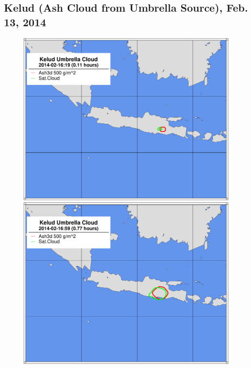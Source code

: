 \subsection{Kelud (Ash Cloud from Umbrella Source), Feb. 13, 2014}
\begin{figure}[htbp]
\includegraphics[angle=0,scale=0.3]{Figures/TestCase_Results/ValidTest/Kelud_CloudOutline_0.pdf}
\includegraphics[angle=0,scale=0.3]{Figures/TestCase_Results/ValidTest/Kelud_CloudOutline_1.pdf}

\end{figure}
